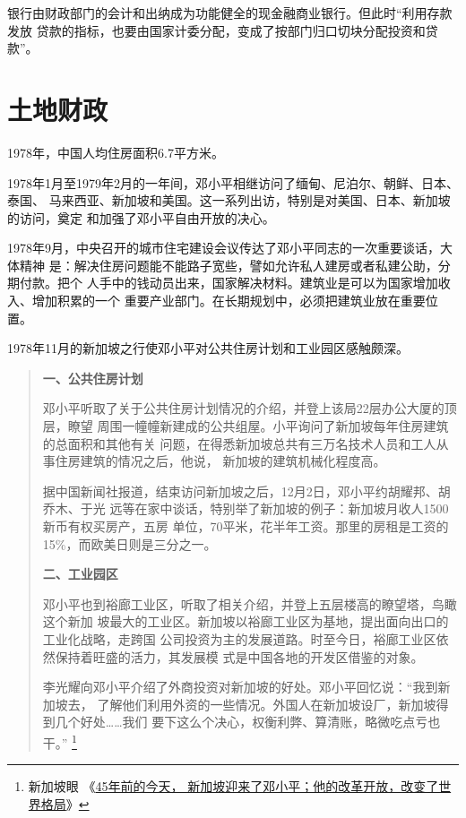 银行由财政部门的会计和出纳成为功能健全的现金融商业银行。但此时“利用存款发放
贷款的指标，也要由国家计委分配，变成了按部门归口切块分配投资和贷款”。



\section{土地财政}

1978年，中国人均住房面积6.7平方米。

1978年1月至1979年2月的一年间，邓小平相继访问了缅甸、尼泊尔、朝鲜、日本、泰国、
马来西亚、新加坡和美国。这一系列出访，特别是对美国、日本、新加坡的访问，奠定
和加强了邓小平自由开放的决心。

1978年9月，中央召开的城市住宅建设会议传达了邓小平同志的一次重要谈话，大体精神
是：解决住房问题能不能路子宽些，譬如允许私人建房或者私建公助，分期付款。把个
人手中的钱动员出来，国家解决材料。建筑业是可以为国家增加收入、增加积累的一个
重要产业部门。在长期规划中，必须把建筑业放在重要位置。

1978年11月的新加坡之行使邓小平对公共住房计划和工业园区感触颇深。
\begin{quotation}
  \textbf{一、公共住房计划}

  邓小平听取了关于公共住房计划情况的介绍，并登上该局22层办公大厦的顶层，瞭望
  周围一幢幢新建成的公共组屋。小平询问了新加坡每年住房建筑的总面积和其他有关
  问题，在得悉新加坡总共有三万名技术人员和工人从事住房建筑的情况之后，他说，
  新加坡的建筑机械化程度高。

  据中国新闻社报道，结束访问新加坡之后，12月2日，邓小平约胡耀邦、胡乔木、于光
  远等在家中谈话，特别举了新加坡的例子：新加坡月收人1500新币有权买房产，五房
  单位，70平米，花半年工资。那里的房租是工资的15\%，而欧美日则是三分之一。

  \textbf{二、工业园区}

  邓小平也到裕廊工业区，听取了相关介绍，并登上五层楼高的瞭望塔，鸟瞰这个新加
  坡最大的工业区。新加坡以裕廊工业区为基地，提出面向出口的工业化战略，走跨国
  公司投资为主的发展道路。时至今日，裕廊工业区依然保持着旺盛的活力，其发展模
  式是中国各地的开发区借鉴的对象。

  李光耀向邓小平介绍了外商投资对新加坡的好处。邓小平回忆说：“我到新加坡去，
  了解他们利用外资的一些情况。外国人在新加坡设厂，新加坡得到几个好处……我们
  要下这么个决心，权衡利弊、算清账，略微吃点亏也干。” \footnote{新加坡眼
    《\href{https://www.yan.sg/gaibianeshijiegejucbxiaopige/}{45年前的今天，
      新加坡迎来了邓小平；他的改革开放，改变了世界格局}》}
\end{quotation}

